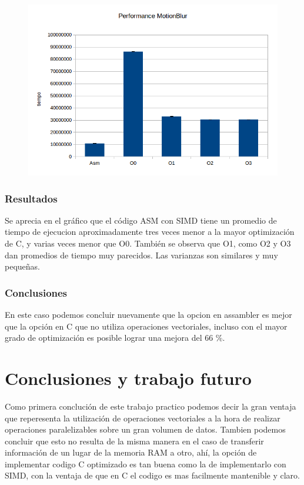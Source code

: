 \documentclass[a4paper]{article}
\begin{document}
\begin{figure}[h!]
  \begin{center}
  \includegraphics[scale=0.66]{Graficos1.4/mbl/per.jpg}
  \label{nombreparareferenciar11}
  \end{center}
\end{figure}

\subsubsection{Resultados}
Se aprecia en el gráfico que el código ASM con SIMD tiene un promedio de tiempo de ejecucion aproximadamente tres veces menor a la mayor optimización de C, y varias veces menor que O0. También se observa que O1, como O2 y O3 dan promedios de tiempo muy parecidos. Las varianzas son similares y muy pequeñas.

\subsubsection{Conclusiones}

En este caso podemos concluir nuevamente que la opcion en assambler es mejor que la opción en C que no utiliza operaciones vectoriales, incluso con el mayor grado de optimización es posible lograr una mejora del 66 \%.

\newpage
\section{Conclusiones y trabajo futuro}

Como primera conclución de este trabajo practico podemos decir la gran ventaja que reperesenta la utilización de operaciones vectoriales a la hora de realizar operaciones paralelizables sobre un gran volumen de datos. Tambien podemos concluir que esto no resulta de la misma manera en el caso de transferir información de un lugar de la memoria RAM a otro, ahí, la opción de implementar codigo C optimizado es tan buena como la de implementarlo con SIMD, con la ventaja de que en C el codigo es mas facilmente mantenible y claro.
\end{document}

